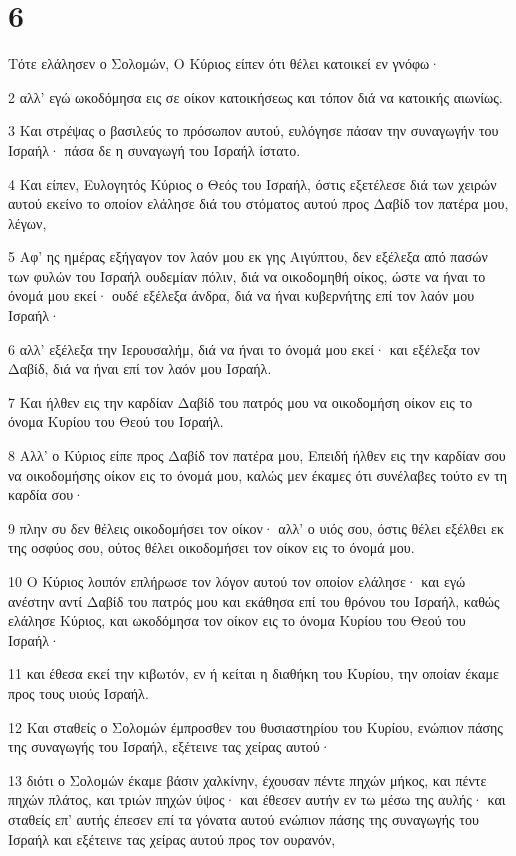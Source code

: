 \chapter{6}

\par Τότε ελάλησεν ο Σολομών, Ο Κύριος είπεν ότι θέλει κατοικεί εν γνόφω·
\par 2 αλλ' εγώ ωκοδόμησα εις σε οίκον κατοικήσεως και τόπον διά να κατοικής αιωνίως.
\par 3 Και στρέψας ο βασιλεύς το πρόσωπον αυτού, ευλόγησε πάσαν την συναγωγήν του Ισραήλ· πάσα δε η συναγωγή του Ισραήλ ίστατο.
\par 4 Και είπεν, Ευλογητός Κύριος ο Θεός του Ισραήλ, όστις εξετέλεσε διά των χειρών αυτού εκείνο το οποίον ελάλησε διά του στόματος αυτού προς Δαβίδ τον πατέρα μου, λέγων,
\par 5 Αφ' ης ημέρας εξήγαγον τον λαόν μου εκ γης Αιγύπτου, δεν εξέλεξα από πασών των φυλών του Ισραήλ ουδεμίαν πόλιν, διά να οικοδομηθή οίκος, ώστε να ήναι το όνομά μου εκεί· ουδέ εξέλεξα άνδρα, διά να ήναι κυβερνήτης επί τον λαόν μου Ισραήλ·
\par 6 αλλ' εξέλεξα την Ιερουσαλήμ, διά να ήναι το όνομά μου εκεί· και εξέλεξα τον Δαβίδ, διά να ήναι επί τον λαόν μου Ισραήλ.
\par 7 Και ήλθεν εις την καρδίαν Δαβίδ του πατρός μου να οικοδομήση οίκον εις το όνομα Κυρίου του Θεού του Ισραήλ.
\par 8 Αλλ' ο Κύριος είπε προς Δαβίδ τον πατέρα μου, Επειδή ήλθεν εις την καρδίαν σου να οικοδομήσης οίκον εις το όνομά μου, καλώς μεν έκαμες ότι συνέλαβες τούτο εν τη καρδία σου·
\par 9 πλην συ δεν θέλεις οικοδομήσει τον οίκον· αλλ' ο υιός σου, όστις θέλει εξέλθει εκ της οσφύος σου, ούτος θέλει οικοδομήσει τον οίκον εις το όνομά μου.
\par 10 Ο Κύριος λοιπόν επλήρωσε τον λόγον αυτού τον οποίον ελάλησε· και εγώ ανέστην αντί Δαβίδ του πατρός μου και εκάθησα επί του θρόνου του Ισραήλ, καθώς ελάλησε Κύριος, και ωκοδόμησα τον οίκον εις το όνομα Κυρίου του Θεού του Ισραήλ·
\par 11 και έθεσα εκεί την κιβωτόν, εν ή κείται η διαθήκη του Κυρίου, την οποίαν έκαμε προς τους υιούς Ισραήλ.
\par 12 Και σταθείς ο Σολομών έμπροσθεν του θυσιαστηρίου του Κυρίου, ενώπιον πάσης της συναγωγής του Ισραήλ, εξέτεινε τας χείρας αυτού·
\par 13 διότι ο Σολομών έκαμε βάσιν χαλκίνην, έχουσαν πέντε πηχών μήκος, και πέντε πηχών πλάτος, και τριών πηχών ύψος· και έθεσεν αυτήν εν τω μέσω της αυλής· και σταθείς επ' αυτής έπεσεν επί τα γόνατα αυτού ενώπιον πάσης της συναγωγής του Ισραήλ και εξέτεινε τας χείρας αυτού προς τον ουρανόν,
